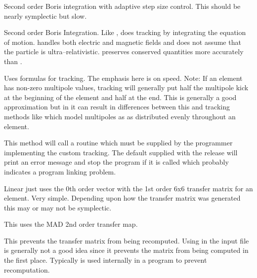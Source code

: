 \begin{description}
\item[\vn{adaptive_boris}]
Second order Boris integration\cite{b:boris} with adaptive step size control.
This should be nearly symplectic but slow.

\item[\vn{Boris!tracking method}]
Second order Boris Integration\cite{b:boris}. Like ,
 does tracking by integrating the equation of
motion.  handles both electric and magnetic fields and does
not assume that the particle is ultra--relativistic.  preserves
conserved quantities more accurately than .

\item[\vn{Bmad_Standard!tracking method}]
Uses formulas for tracking. The emphasis here is on speed. Note: If an
element has non-zero multipole values,  tracking
will generally put half the multipole kick at the beginning of the
element and half at the end. This is generally a good approximation
but in it can result in differences between this and tracking methods
like  which model multipoles as as distributed evenly
throughout an element.

\item[\vn{Custom!tracking method}]
This method will call a routine  which must be
supplied by the programmer implementing the custom tracking. The
default  supplied with the \bmad release will print
an error message and stop the program if it is called which probably
indicates a program linking problem.

\item[\vn{Linear}]
Linear just uses the 0th order vector with the 1st order 6x6 transfer
matrix for an element. Very simple.  Depending upon how the transfer
matrix was generated this may or may not be symplectic.

\item[\vn{MAD}]
This uses the MAD 2nd order transfer map.

\item[\vn{None!tracking method}]
This prevents the transfer matrix from being recomputed.
Using  in the input file is generally not a good idea since
it prevents the matrix from being computed in the first place.
Typically  is used internally in a program to prevent recomputation.


\end{description}
